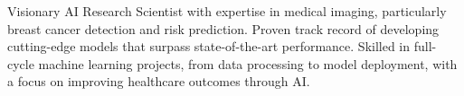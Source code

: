

\begin{cvparagraph}

Visionary AI Research Scientist with expertise in medical imaging, particularly breast cancer detection and risk prediction. Proven track record of developing cutting-edge models that surpass state-of-the-art performance. Skilled in full-cycle machine learning projects, from data processing to model deployment, with a focus on improving healthcare outcomes through AI.
\end{cvparagraph}
